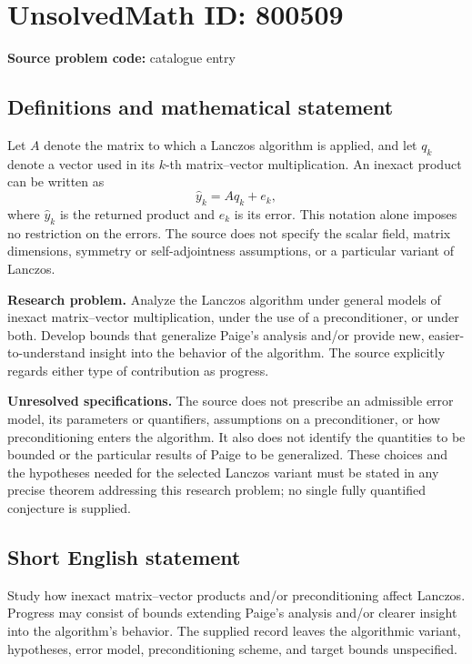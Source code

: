 \documentclass[11pt]{article}
\begin{document}
\section*{UnsolvedMath ID: 800509}
\textbf{Source problem code:} catalogue entry
\subsection{Definitions and mathematical statement}
Let \(A\) denote the matrix to which a Lanczos algorithm is applied, and let \(q_k\) denote a vector used in its \(k\)-th matrix--vector multiplication. An inexact product can be written as
\[
\widehat y_k=Aq_k+e_k,
\]
where \(\widehat y_k\) is the returned product and \(e_k\) is its error. This notation alone imposes no restriction on the errors. The source does not specify the scalar field, matrix dimensions, symmetry or self-adjointness assumptions, or a particular variant of Lanczos.

\textbf{Research problem.} Analyze the Lanczos algorithm under general models of inexact matrix--vector multiplication, under the use of a preconditioner, or under both. Develop bounds that generalize Paige's analysis and/or provide new, easier-to-understand insight into the behavior of the algorithm. The source explicitly regards either type of contribution as progress.

\textbf{Unresolved specifications.} The source does not prescribe an admissible error model, its parameters or quantifiers, assumptions on a preconditioner, or how preconditioning enters the algorithm. It also does not identify the quantities to be bounded or the particular results of Paige to be generalized. These choices and the hypotheses needed for the selected Lanczos variant must be stated in any precise theorem addressing this research problem; no single fully quantified conjecture is supplied.
\subsection{Short English statement}
Study how inexact matrix--vector products and/or preconditioning affect Lanczos. Progress may consist of bounds extending Paige's analysis and/or clearer insight into the algorithm's behavior. The supplied record leaves the algorithmic variant, hypotheses, error model, preconditioning scheme, and target bounds unspecified.
\end{document}
